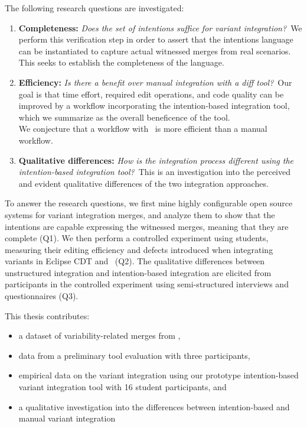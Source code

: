 The following research questions are investigated:

\newcommand{\RQA}{Does the set of intentions suffice for variant integration?}
\newcommand{\RQB}{Is there a benefit over manual integration with a diff tool?}
\newcommand{\RQC}{How is the integration process different using the intention-based integration tool?}

\begin{enumerate}[label={Q\arabic*}]

        \item\label{rq-a} \textbf{Completeness:} \textit{\RQA}~We perform this verification step in order to assert that the intentions language can be instantiated to capture actual witnessed merges from real scenarios. This seeks to establish the completeness of the language.

        \item\label{rq-b} \textbf{Efficiency:} \textit{\RQB}~Our goal is that time effort, required edit operations, and code quality can be improved by a workflow incorporating the intention-based integration tool, which we summarize as the overall beneficence of the tool.\\
        We conjecture that a workflow with \tooln~is more efficient than a manual workflow.
        
        \item\label{rq-c} \textbf{Qualitative differences:} \textit{\RQC}~This is an investigation into the perceived and evident qualitative differences of the two integration approaches.
        
\end{enumerate}

To answer the research questions, we first mine highly configurable open source systems for variant integration merges, and analyze them to show that the intentions are capable expressing the witnessed merges, meaning that they are complete (Q1). We then perform a controlled experiment using students, measuring their editing efficiency and defects introduced when integrating variants in Eclipse CDT and \tooln~(Q2). The qualitative differences between unstructured integration and intention-based integration are elicited from participants in the controlled experiment using semi-structured interviews and questionnaires (Q3).

This thesis contributes:
\begin{itemize}
    \item a dataset of variability-related merges from \marlin,
    \item data from a preliminary tool evaluation with three participants,
    \item empirical data on the variant integration using our prototype intention-based variant integration tool with 16 student participants, and
    \item a qualitative investigation into the differences between intention-based and manual variant integration
\end{itemize}

